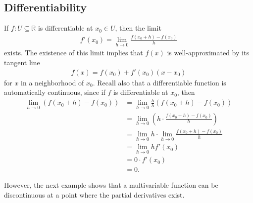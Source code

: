 \documentclass[12pt,letterpaper,reqno]{article}
\numberwithin{equation}{section}
\newcommand{\R}{\ensuremath{\mathbb R}}
\begin{document}
{\subsection{Differentiability}
If $f:U \subseteq \R$ is differentiable at $x_0 \in U$, then the limit
\begin{align}\label{eq:old_derivative}
	f'(x_0)=\lim_{h \to 0}\frac{f(x_0+h)-f(x_0)}{h}
\end{align}
exists. The existence of this limit implies that $f(x)$ is well-approximated by its tangent line
\begin{align*}
	f(x)=f(x_0)+f'(x_0)(x-x_0)
\end{align*}
for $x$ in a neighborhood of $x_0$. Recall also that a differentiable function is automatically continuous, since if $f$ is differentiable at $x_0$, then 
\begin{align*}
	\lim_{h \to 0}(f(x_0+h)-f(x_0))&=\lim_{h \to 0}\frac{h}{h}(f(x_0+h)-f(x_0)) \\
	&=\lim_{h \to 0}\left(h \cdot \frac{f(x_0+h)-f(x_0)}{h}\right) \\
	&=\lim_{h \to 0}h \cdot \lim_{h \to 0}\frac{f(x_0+h)-f(x_0)}{h} \\
	&=\lim_{h \to 0}h f'(x_0) \\
	&=0 \cdot f'(x_0) \\
	&=0.
\end{align*}

However, the next example shows that a multivariable function can be discontinuous at a point where the partial derivatives exist.

}
\end{document}
